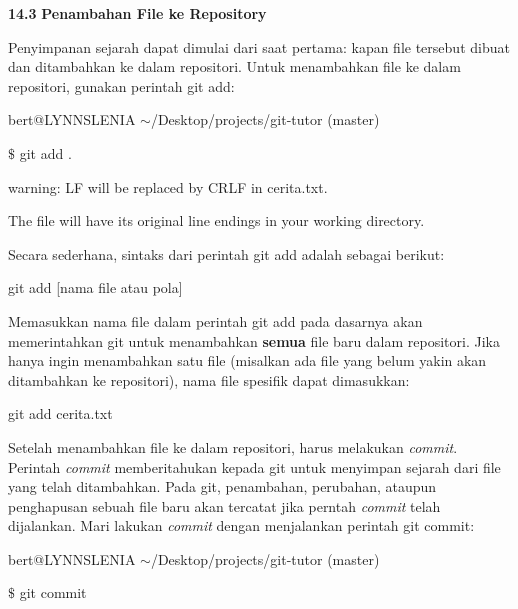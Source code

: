 \vspace{10pt}
\textbf{14.3 }\textbf{Penambahan File ke Repository} \par
\noindent 
 \hspace*{0.64in} Penyimpanan sejarah dapat dimulai dari saat pertama: kapan file tersebut dibuat dan ditambahkan ke dalam repositori. Untuk menambahkan file ke dalam repositori, gunakan perintah git add: \par
{\fontsize{10pt}{10pt}\selectfont bert@LYNNSLENIA  $  \sim  $/Desktop/projects/git-tutor (master)} \par
{\fontsize{10pt}{10pt}\selectfont  $  \$  $ git add .} \par
{\fontsize{10pt}{10pt}\selectfont warning: LF will be replaced by CRLF in cerita.txt.} \par
{\fontsize{10pt}{10pt}\selectfont The file will have its original line endings in your working directory.} \par
\noindent 
\vspace{12pt}
\noindent 
Secara sederhana, sintaks dari perintah git add adalah sebagai berikut: \par
{\fontsize{10pt}{10pt}\selectfont git add [nama file atau pola]} \par
\noindent 
\vspace{12pt}
\noindent 
 \hspace*{0.64in} Memasukkan nama file dalam perintah git add pada dasarnya akan memerintahkan git untuk menambahkan \textbf{semua} file baru dalam repositori. Jika hanya ingin menambahkan satu file (misalkan ada file yang belum yakin akan ditambahkan ke repositori), nama file spesifik dapat dimasukkan: \par
{\fontsize{10pt}{10pt}\selectfont git add cerita.txt} \par
\noindent 
\vspace{12pt}
Setelah menambahkan file ke dalam repositori, harus melakukan \emph{commit}. Perintah \emph{commit} memberitahukan kepada git untuk menyimpan sejarah dari file yang telah ditambahkan. Pada git, penambahan, perubahan, ataupun penghapusan sebuah file baru akan tercatat jika perntah \emph{commit} telah dijalankan. Mari lakukan \emph{commit} dengan menjalankan perintah git commit: \par
{\fontsize{10pt}{10pt}\selectfont bert@LYNNSLENIA  $  \sim  $/Desktop/projects/git-tutor (master)} \par
{\fontsize{10pt}{10pt}\selectfont  $  \$  $ git commit} \par
\noindent 
\vspace{12pt}
